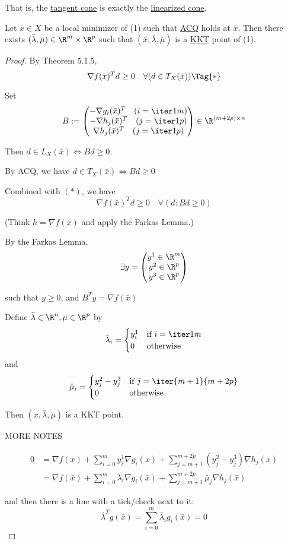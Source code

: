 That is, the \href{add7a4b}{tangent cone} is exactly the
\href{ca4f471}{linearized cone}.

\label{b1c5437}

Let $\bar x\in X$ be a local minimizer of (1) such that
\href{adc266e}{ACQ} holds at $\bar x$. Then there exists
$(\bar\lambda,\bar\mu)\in\R^m\times\R^p$ such that $(\bar
	x,\bar\lambda,\bar\mu)$ is a \href{b38093d}{KKT} point of (1).

\begin{proof}
	\def\bm{\bar\mu}\def\bl{\bar\lambda}\def\bx{\bar x}
	By Theorem 5.1.5,
	\begin{equation*}
    \nabla f(\bx)^Td\geq0\quad\forall(d\in T_X(\bx))\Tag{*}
	\end{equation*}

	Set
	$$
		B:=\begin{pmatrix}
			-\nabla g_i(\bx)^T\quad(i=\iter1m) \\
			-\nabla h_j(\bx)^T\quad(j=\iter1p) \\
			\nabla h_j(\bx)^T\quad(j=\iter1p)
		\end{pmatrix}\in\R^{(m+2p)\times{n}}
	$$

	Then $d\in L_X(\bx)\iff Bd\geq0$.

	By ACQ, we have $d\in T_X(\bx)\iff Bd\geq0$

	Combined with $(*)$, we have
	$$
		\nabla f(\bx)^Td\geq0\quad\forall(d:Bd\geq0)
	$$

	(Think $h=\nabla f(\bx)$ and apply the Farkas Lemma.)

	By the Farkas Lemma,
	$$
		\exists y=\begin{pmatrix}y^1\in\R^m\\y^2\in\R^p\\y^3\in\R^p\end{pmatrix}
	$$

	such that $y\geq0$, and $B^Ty=\nabla f(\bx)$

	Define $\bl\in\R^n,\bm\in\R^p$ by
	$$
		\bl_i=\begin{cases}
			y^1_i & \text{if $i=\iter1m$} \\
			0     & \text{otherwise}
		\end{cases}
	$$
	and
	$$
		\bm_i=\begin{cases}
			y^2_j - y^3_j & \text{if $j=\iter{m+1}{m+2p}$} \\
			0             & \text{otherwise}
		\end{cases}
	$$

	Then $(\bx,\bl,\bm)$ is a KKT point.

	MORE NOTES

	\begin{align*}
		0
		 & = \nabla f(\bx)
		+\sum_{i=0}^my^1_i\nabla g_i(\bx)
		+\sum_{j=m+1}^{m+2p}(y^2_j-y^3_j)\nabla h_j(\bx) \\
		 & = \nabla f(\bx)
		+\sum_{i=0}^m \bl_i\nabla g_i(\bx)
		+\sum_{j=m+1}^{m+2p}\bm_j\nabla h_j(\bx)
	\end{align*}

	and then there is a line with a tick/check next to it:
	$$
		\bl^Tg(\bx)=\sum_{i=0}^m\bl_ig_i(\bx)=0
	$$
\end{proof}

